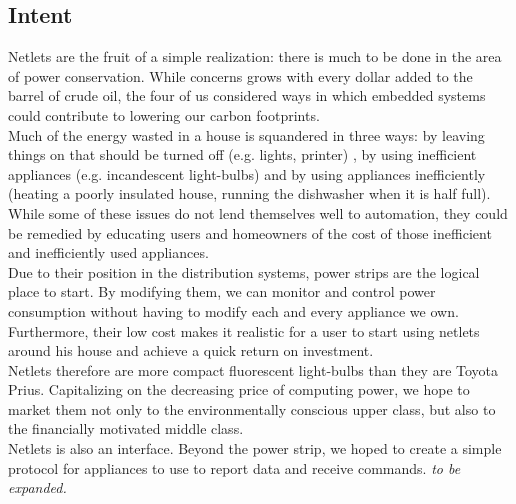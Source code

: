 \subsection{Intent}

Netlets are the fruit of a simple realization: there is much to be done in the area of power conservation. While concerns grows with every dollar added to the barrel of crude oil, the four of us considered ways in which embedded systems could contribute to lowering our carbon footprints.\\

Much of the energy wasted in a house is squandered in three ways: by leaving things on that should be turned off (e.g. lights, printer) , by using inefficient appliances (e.g. incandescent light-bulbs) and by using appliances inefficiently (heating a poorly insulated house, running the dishwasher when it is half full). While some of these issues do not lend themselves well to automation, they could be remedied by educating users and homeowners of the cost of those inefficient and inefficiently used appliances.\\

Due to their position in the distribution systems, power strips are the logical place to start. By modifying them, we can monitor and control power consumption without having to modify each and every appliance we own. Furthermore, their low cost makes it realistic for a user to start using netlets around his house and achieve a quick return on investment.\\

Netlets therefore are more compact fluorescent light-bulbs than they are Toyota Prius. Capitalizing on the decreasing price of computing power, we hope to market them not only to the environmentally conscious upper class, but also to the financially motivated middle class.\\

Netlets is also an interface. Beyond the power strip, we hoped to create a simple protocol for appliances to use to report data and receive commands. \textit{to be expanded.}\\

